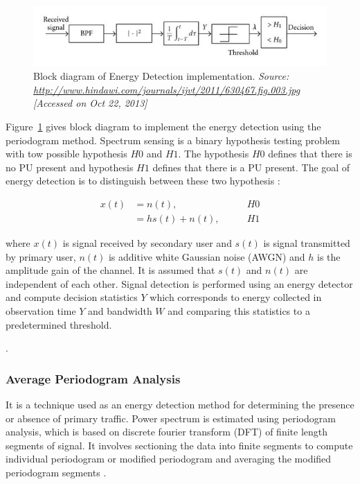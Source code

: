 \begin{figure}[h]
\centering
\includegraphics[width=1\textwidth]{energyDetector}
\caption[Block diagram of Energy Detection implementatio]{Block diagram of Energy Detection implementation. \emph{Source: \url{http://www.hindawi.com/journals/ijvt/2011/630467.fig.003.jpg} [Accessed on Oct 22, 2013]}}
\label{energyDetector}
\end{figure}




Figure~\ref{energyDetector} gives block diagram to implement the energy detection using the periodogram method.
Spectrum sensing is a binary hypothesis testing problem with tow possible hypothesis $H0$ and $H1$.
The hypothesis $H0$ defines that there is no PU present and hypothesis $H1$ defines that there is a PU present. The goal of energy detection is to distinguish between these two hypothesis \cite{sarijari09}:

\begin{align}
	x(t) &= n(t), \qquad & H0 \nonumber\\
		&= h s(t)+n(t), \qquad & H1 \nonumber
\end{align}

where $x(t)$ is signal received by secondary user and $s(t)$ is signal transmitted by primary user, $n(t)$ is additive white Gaussian noise (AWGN) and $h$ is the amplitude gain of the channel. It is assumed that $s(t)$  and $n(t)$ are independent of each other. Signal detection is performed using an energy detector and compute decision statistics $Y$ which corresponds to energy collected in observation time $Y$ and bandwidth $W$ and comparing this statistics to a predetermined threshold. 

.
\subsubsection{Average Periodogram Analysis}
 It is a technique used as an energy detection method for determining the presence or absence of primary traffic. 
Power spectrum is estimated using periodogram analysis, which is based on discrete fourier 
transform (DFT) of finite length segments of signal. It involves sectioning the data into
finite segments to compute individual periodogram or modified periodogram and averaging the modified periodogram segments \cite{welch67}.


